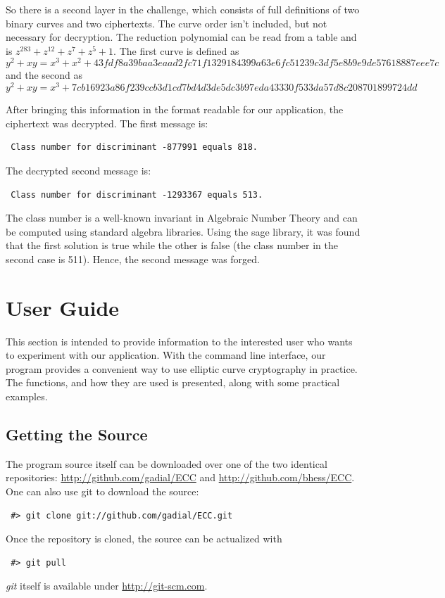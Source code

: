 \documentclass[11pt,english]{article}
\begin{document}
So there is a second layer in the challenge, which consists of full definitions of two binary curves and two ciphertexts. The curve order isn't included, but not necessary for decryption. The reduction polynomial can be read from a table and is $z^{283}+z^{12}+z^7+z^5+1$. The first curve is defined as
\begin{displaymath}
 y^2 + xy = x^3 + x^2 + 43fdf8a39baa3eaad2fc71f1329184399a63e6fc51239c3df5e8b9e9de57618887eee7c
\end{displaymath}
and the second as 
\begin{displaymath}
 y^2 + xy = x^3 + 7cb16923a86f239ccb3d1cd7bd4d3de5dc3b97eda43330f533da57d8c208701899724dd
\end{displaymath}

After bringing this information in the format readable for our application, the ciphertext was decrypted. The first message is:

\begin{verbatim}
 Class number for discriminant -877991 equals 818.
\end{verbatim}

The decrypted second message is:

\begin{verbatim}
 Class number for discriminant -1293367 equals 513.
\end{verbatim}

The class number is a well-known invariant in Algebraic Number Theory and can be computed using standard algebra libraries. Using the sage library, it was found that the first solution is true while the other is false (the class number in the second case is 511). Hence, the second message was forged.

\section{User Guide}
\label{User Guide}
This section is intended to provide information to the interested user who wants to experiment with our application.
With the command line interface, our program provides a convenient way to use elliptic curve cryptography in practice. The functions, and how they are used is presented, along with some practical examples.

\subsection{Getting the Source}
The program source itself can be downloaded over one of the two identical repositories: \url{http://github.com/gadial/ECC} and \url{http://github.com/bhess/ECC}. One can also use git to download the source:
\begin{verbatim}
 #> git clone git://github.com/gadial/ECC.git
\end{verbatim}
Once the repository is cloned, the source can be actualized with
\begin{verbatim}
 #> git pull
\end{verbatim}
\emph{git} itself is available under \url{http://git-scm.com}.
\end{document}
